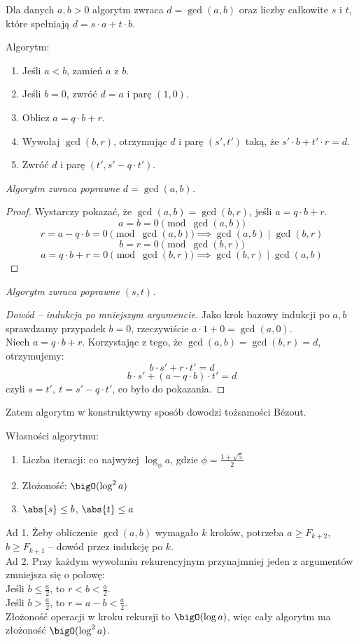 Dla danych \( a, b > 0 \) algorytm zwraca \( d = \gcd(a,b) \) oraz liczby całkowite \( s \) i \( t \), które spełniają \( d = s\cdot a + t\cdot b \).

\begin{greyframe}
	Algorytm:
	\begin{enumerate}
		\item Jeśli \( a < b \), zamień \( a \) z \( b \).
		\item Jeśli \( b = 0 \), zwróć \( d = a \) i parę \( (1,0) \).
		\item Oblicz \( a = q \cdot b + r \).
		\item Wywołaj \( \gcd(b,r) \), otrzymując \( d \) i parę \( (s', t') \) taką, że \( s'\cdot b + t' \cdot r = d \).
		\item Zwróć \( d \) i parę \( (t', s' - q \cdot t') \).
	\end{enumerate}
\end{greyframe}

\vspace{1em}\noindent
\textit{Algorytm zwraca poprawne \( d = \gcd(a, b) \).}
\begin{proof}
	Wystarczy pokazać, że \( \gcd(a, b) = \gcd(b, r) \), jeśli \( a = q \cdot b + r \).
	\[
		a = b = 0 \pmod{\gcd(a, b)}
	\]
	\[
		r = a - q \cdot b = 0 \pmod{\gcd(a, b)} \implies \gcd(a, b) \mid \gcd(b, r)
	\]
	\[
		b = r = 0 \pmod{\gcd(b, r)}
	\]
	\[
		a = q \cdot b + r = 0 \pmod{\gcd(b, r)} \implies \gcd(b, r) \mid \gcd(a, b)
	\]
\end{proof}
\textit{Algorytm zwraca poprawne \( (s, t) \).}
\begin{proof}[Dowód -- indukcja po mniejszym argumencie]
	Jako krok bazowy indukcji po \( a, b \) sprawdzamy przypadek \( b = 0 \), rzeczywiście \( a \cdot 1 + 0 = \gcd(a, 0) \). \\
	Niech \( a = q \cdot b + r \). Korzystając z tego, że \( \gcd(a, b) = \gcd(b, r) = d \), otrzymujemy:
	\[
		b \cdot s' + r \cdot t' = d
	\]
	\[
		b \cdot s' + (a - q \cdot b) \cdot t' = d
	\]
	czyli \( s = t', \ t = s' - q \cdot t' \), co było do pokazania.
\end{proof}
Zatem algorytm w konstruktywny sposób dowodzi tożsamości B\'ezout.

Własności algorytmu:
\begin{enumerate}
	\item Liczba iteracji: co najwyżej \( \log_{\phi} a \), gdzie \( \phi = \frac{1 + \sqrt{5}}{2} \)
	\item Złożoność: \( \bigO(\log^2 a) \)
	\item \( \abs{s} \leq b \), \( \abs{t} \leq a \)
\end{enumerate}
Ad 1. Żeby obliczenie \( \gcd(a, b) \) wymagało \( k \) kroków, potrzeba \( a \geq F_{k+2} \), \( b \geq F_{k+1} \) -- dowód przez indukcję po \( k \). \\
Ad 2. Przy każdym wywołaniu rekurencyjnym przynajmniej jeden z argumentów zmniejsza się o połowę: \\
Jeśli \( b \leq \frac{a}{2} \), to \( r < b < \frac{a}{2} \). \\
Jeśli \( b > \frac{a}{2} \), to \( r = a - b < \frac{a}{2} \). \\
Złożoność operacji w kroku rekursji  to \( \bigO(\log a) \), więc cały algorytm ma złożoność \( \bigO(\log^2 a) \).